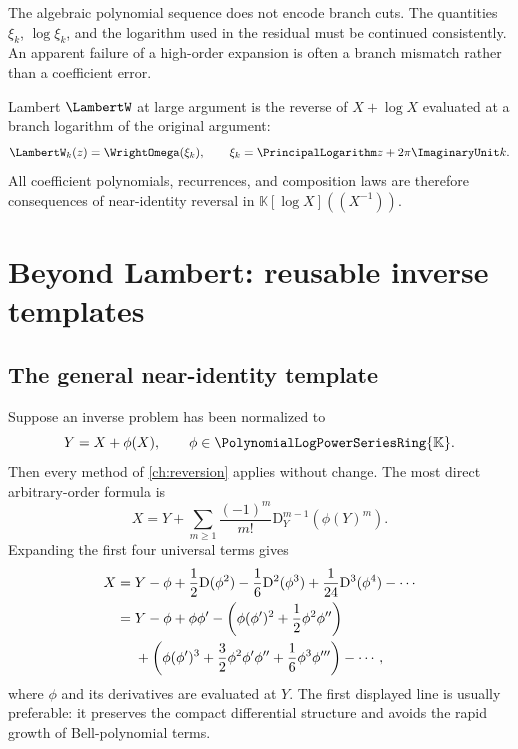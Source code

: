 \documentclass[11pt,oneside,openany]{book}
\newcommand{\K}{\mathbb{K}}
\newcommand{\Rring}{\PolynomialLogPowerSeriesRing{\K}}
\newcommand{\D}{\mathrm{D}}
\begin{document}
\begin{cautionbox}
The algebraic polynomial sequence does not encode branch cuts.  The quantities
\(\xi_k\), \(\log\xi_k\), and the logarithm used in the residual must be
continued consistently.  An apparent failure of a high-order expansion is
often a branch mismatch rather than a coefficient error.
\end{cautionbox}

\begin{summarybox}
Lambert \(\LambertW\) at large argument is the reverse of \(X+\log X\) evaluated at a
branch logarithm of the original argument:
\[
 \LambertW_k(z)=\WrightOmega(\xi_k),
 \qquad \xi_k=\PrincipalLogarithm z+2\pi\ImaginaryUnit k.
\]
All coefficient polynomials, recurrences, and composition laws are therefore
consequences of near-identity reversal in
\(\K[\log X]((X^{-1}))\).
\end{summarybox}


\chapter{Beyond Lambert: reusable inverse templates}
\label{ch:families}

\section{The general near-identity template}
Suppose an inverse problem has been normalized to
\begin{equation}\label{eq:generalnearinverse}
 Y=X+\phi(X),
 \qquad \phi\in\Rring.
\end{equation}
Then every method of \cref{ch:reversion} applies without change.  The most
direct arbitrary-order formula is
\begin{equation}\label{eq:generalnearinverseformula}
 X=Y+\sum_{m\geq1}\frac{(-1)^m}{m!}
 \D_Y^{m-1}\!\left(\phi(Y)^m\right).
\end{equation}
Expanding the first four universal terms gives
\begin{align}
 X={}&Y-\phi
 +\frac12\D(\phi^2)
 -\frac16\D^2(\phi^3)
 +\frac1{24}\D^3(\phi^4)-\cdots\notag\\
 ={}&Y-\phi+\phi\phi'
 -\left(\phi(\phi')^2+\frac12\phi^2\phi''\right)\notag\\
 &+\left(
   \phi(\phi')^3+\frac32\phi^2\phi'\phi''
   +\frac16\phi^3\phi'''
   \right)-\cdots,
 \label{eq:generalexpandedinverse}
\end{align}
where \(\phi\) and its derivatives are evaluated at \(Y\).  The first displayed
line is usually preferable: it preserves the compact differential structure
and avoids the rapid growth of Bell-polynomial terms.
\end{document}
